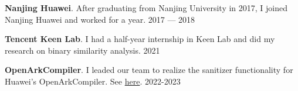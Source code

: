 \textbf{Nanjing Huawei}. After graduating from Nanjing University in 2017, I joined Nanjing Huawei and worked for a year. \hfill 2017 --- 2018

\textbf{Tencent Keen Lab}. I had a half-year internship in Keen Lab and did my research on binary similarity analysis. \hfill 2021

\textbf{OpenArkCompiler}. I leaded our team to realize the sanitizer functionality for Huawei's OpenArkCompiler. See \href{https://gitee.com/openarkcompiler/OpenArkCompiler/tree/master/src/mapleall/maple\_san}{here}. \hfill 2022-2023
